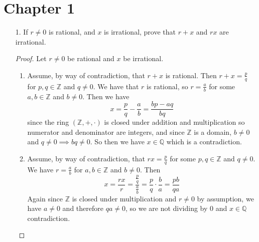 \documentclass[hidelinks,12pt]{article}
\title{\scalebox{2}{Math 724 Homework 1}}
\author{\scalebox{1.5}{Theo Koss}}
\date{September 2024}
\newcommand{\Z}{\mathbb{Z}}
\newcommand{\Q}{\mathbb{Q}}
\begin{document}
\maketitle
\section{Chapter 1}
\begin{enumerate}
    \item[1.] If $r\neq0$ is rational, and $x$ is irrational, prove that $r+x$ and $rx$ are irrational.
        \begin{proof}
            Let $r\neq0$ be rational and $x$ be irrational.
            \begin{enumerate}[label=(\alph*)]
                \item Assume, by way of contradiction, that $r+x$ is rational. Then $r+x=\frac{p}{q}$ for $p,q\in\Z$ and $q\neq0$. We have that $r$ is rational, so $r=\frac{a}{b}$ for some $a,b\in\Z$ and $b\neq0$. Then we have \[x=\frac{p}{q}-\frac{a}{b}=\frac{bp-aq}{bq}\] since the ring $(\Z,+,\cdot)$ is closed under addition and multiplication so numerator and denominator are integers, and since $\Z$ is a domain, $b\neq0$ and $q\neq0\implies bq\neq0$. So then we have $x\in\Q$ which is a contradiction.
    \item Assume, by way of contradiction, that $rx=\frac{p}{q}$ for some $p,q\in\Z$ and $q\neq0$. We have $r=\frac{a}{b}$ for $a,b\in\Z$ and $b\neq0$. Then \[x=\frac{rx}{r}=\frac{\frac{p}{q}}{\frac{a}{b}}=\frac{p}{q}\cdot\frac{b}{a}=\frac{pb}{qa}\] Again since $\Z$ is closed under multiplication and $r\neq0$ by assumption, we have $a\neq0$ and therefore $qa\neq0$, so we are not dividing by 0 and $x\in\Q$ contradiction.
           \end{enumerate} 
        \end{proof}
\end{enumerate}
\end{document}
